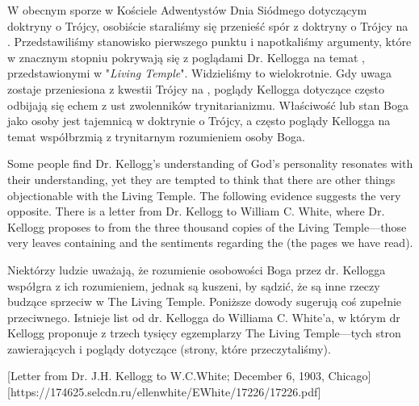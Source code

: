 W obecnym sporze w Kościele Adwentystów Dnia Siódmego dotyczącym doktryny o Trójcy, osobiście staraliśmy się przenieść spór z doktryny o Trójcy na . Przedstawiliśmy stanowisko pierwszego punktu  i napotkaliśmy argumenty, które w znacznym stopniu pokrywają się z poglądami Dr. Kellogga na temat , przedstawionymi w "\textit{Living Temple}". Widzieliśmy to wielokrotnie. Gdy uwaga zostaje przeniesiona z kwestii Trójcy na , poglądy Kellogga dotyczące  często odbijają się echem z ust zwolenników trynitarianizmu. Właściwość lub stan Boga jako osoby jest tajemnicą w doktrynie o Trójcy, a często poglądy Kellogga na temat  współbrzmią z trynitarnym rozumieniem osoby Boga.


Some people find Dr. Kellogg’s understanding of God’s personality resonates with their understanding, yet they are tempted to think that there are other things objectionable with the Living Temple. The following evidence suggests the very opposite. There is a letter from Dr. Kellogg to William C. White, where Dr. Kellogg proposes to  from the three thousand copies of the Living Temple—those very leaves containing and the sentiments regarding the  (the pages we have read).


Niektórzy ludzie uważają, że rozumienie osobowości Boga przez dr. Kellogga współgra z ich rozumieniem, jednak są kuszeni, by sądzić, że są inne rzeczy budzące sprzeciw w The Living Temple. Poniższe dowody sugerują coś zupełnie przeciwnego. Istnieje list od dr. Kellogga do Williama C. White'a, w którym dr Kellogg proponuje  z trzech tysięcy egzemplarzy The Living Temple—tych stron zawierających  i poglądy dotyczące  (strony, które przeczytaliśmy).


[Letter from Dr. J.H. Kellogg to W.C.White; December 6, 1903, Chicago][https://174625.selcdn.ru/ellenwhite/EWhite/17226/17226.pdf]



